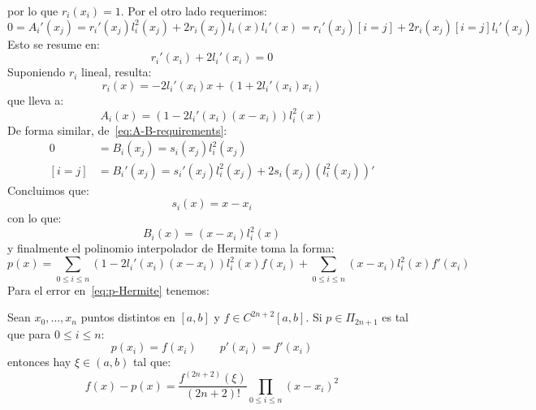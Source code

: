   por lo que \(r_i(x_i) = 1\).
  Por el otro lado requerimos:
  \begin{equation*}
    0
      = A_i'(x_j)
      = r_i'(x_j)l_i^2(x_j) + 2 r_i(x_j) l_i(x) l_i'(x)
      = r_i'(x_j) [i = j] + 2 r_i(x_j) [i = j] l_i'(x_j)
  \end{equation*}
  Esto se resume en:
  \begin{equation*}
    r_i'(x_i) + 2 l_i'(x_i)
      = 0
  \end{equation*}
  Suponiendo \(r_i\) lineal,
  resulta:
  \begin{equation*}
    r_i(x)
      = - 2 l_i'(x_i) x + (1 + 2 l_i'(x_i) x_i)
  \end{equation*}
  que lleva a:
  \begin{equation*}
    A_i(x)
      = \left( 1 - 2 l_i'(x_i) (x - x_i) \right) l_i^2(x)
  \end{equation*}
  De forma similar,
  de~\eqref{eq:A-B-requirements}:
  \begin{align*}
    0
      &= B_i(x_j)
       = s_i(x_j) l_i^2(x_j) \\
    [i = j]
      &= B_i'(x_j)
       = s_i'(x_j) l_i^2(x_j) + 2 s_i(x_j) \left( l_i^2(x_j) \right)'
  \end{align*}
  Concluimos que:
  \begin{equation*}
    s_i(x)
      = x - x_i
  \end{equation*}
  con lo que:
  \begin{equation*}
    B_i(x)
      = (x - x_i) l_i^2(x)
  \end{equation*}
  y finalmente el polinomio interpolador de Hermite
  toma la forma:
  \begin{equation}
    \label{eq:p-Hermite}
    p(x)
      = \sum_{0 \le i \le n} \left( 1 - 2 l_i'(x_i) (x - x_i) \right)
                             l_i^2(x) f(x_i)
          + \sum_{0 \le i \le n} (x - x_i) l_i^2(x) f'(x_i)
  \end{equation}
  Para el error en~\eqref{eq:p-Hermite}
  tenemos:
  \begin{theorem}
    \label{theo:Hermite-interpolation-error}
    Sean \(x_0, \dotsc, x_n\) puntos distintos en \([a, b]\)
    y \(f \in C^{2 n + 2}[a, b]\).
    Si \(p \in \Pi_{2 n + 1}\) es tal que para \(0 \le i \le n\):
    \begin{equation*}
      p(x_i) = f(x_i)
        \qquad
        p'(x_i) = f'(x_i)
    \end{equation*}
    entonces hay \(\xi \in (a, b)\) tal que:
    \begin{equation}
    \label{eq:Hermite-interpolation-error}
      f(x) - p(x)
        = \frac{f^{(2 n + 2)}(\xi)}{(2 n + 2)!} \prod_{0 \le i \le n} (x - x_i)^2
    \end{equation}
  \end{theorem}
